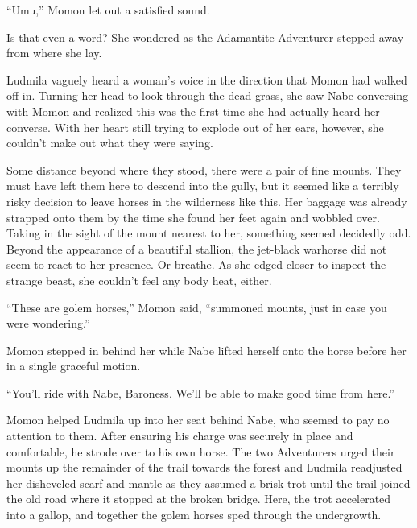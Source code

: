  

“Umu,” Momon let out a satisfied sound.

 

Is that even a word? She wondered as the Adamantite Adventurer stepped away from where she lay.

 

Ludmila vaguely heard a woman’s voice in the direction that Momon had walked off in. Turning her head to look through the dead grass, she saw Nabe conversing with Momon and realized this was the first time she had actually heard her converse. With her heart still trying to explode out of her ears, however, she couldn’t make out what they were saying.

 

Some distance beyond where they stood, there were a pair of fine mounts. They must have left them here to descend into the gully, but it seemed like a terribly risky decision to leave horses in the wilderness like this. Her baggage was already strapped onto them by the time she found her feet again and wobbled over. Taking in the sight of the mount nearest to her, something seemed decidedly odd. Beyond the appearance of a beautiful stallion, the jet-black warhorse did not seem to react to her presence. Or breathe. As she edged closer to inspect the strange beast, she couldn’t feel any body heat, either.

 

“These are golem horses,” Momon said, “summoned mounts, just in case you were wondering.”

 

Momon stepped in behind her while Nabe lifted herself onto the horse before her in a single graceful motion.

 

“You’ll ride with Nabe, Baroness. We’ll be able to make good time from here.”

 

Momon helped Ludmila up into her seat behind Nabe, who seemed to pay no attention to them. After ensuring his charge was securely in place and comfortable, he strode over to his own horse. The two Adventurers urged their mounts up the remainder of the trail towards the forest and Ludmila readjusted her disheveled scarf and mantle as they assumed a brisk trot until the trail joined the old road where it stopped at the broken bridge. Here, the trot accelerated into a gallop, and together the golem horses sped through the undergrowth.

 

